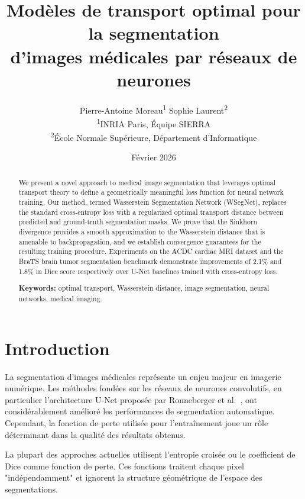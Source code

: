 \documentclass[11pt,a4paper]{article}
\title{Mod\`eles de transport optimal pour la segmentation\\
  d'images m\'edicales par r\'eseaux de neurones}
\author{Pierre-Antoine Moreau\textsuperscript{1}\quad
  Sophie Laurent\textsuperscript{2}\\[6pt]
  \textsuperscript{1}INRIA Paris, \'Equipe SIERRA\\
  \textsuperscript{2}\'Ecole Normale Sup\'erieure, D\'epartement d'Informatique}
\date{F\'evrier 2026}
\theoremstyle{definition}
\begin{document}
\maketitle

\begin{abstract}
We present a novel approach to medical image segmentation that leverages
optimal transport theory to define a geometrically meaningful loss function
for neural network training. Our method, termed Wasserstein Segmentation
Network (WSegNet), replaces the standard cross-entropy loss with a
regularized optimal transport distance between predicted and ground-truth
segmentation masks. We prove that the Sinkhorn divergence provides a
smooth approximation to the Wasserstein distance that is amenable to
backpropagation, and we establish convergence guarantees for the
resulting training procedure. Experiments on the ACDC cardiac MRI
dataset and the BraTS brain tumor segmentation benchmark demonstrate
improvements of 2.1\% and 1.8\% in Dice score respectively over
U-Net baselines trained with cross-entropy loss.

\medskip
\noindent\textbf{Keywords:} optimal transport, Wasserstein distance,
image segmentation, neural networks, medical imaging.
\end{abstract}


\section{Introduction}

La segmentation d'images m\'edicales repr\'esente un enjeu majeur en
imagerie num\'erique. Les m\'ethodes fond\'ees sur les r\'eseaux de
neurones convolutifs, en particulier l'architecture U-Net propos\'ee par
Ronneberger et al.~\cite{ronneberger2015unet}, ont consid\'erablement
am\'elior\'e les performances de segmentation automatique. Cependant,
la fonction de perte utilis\'ee pour l'entra\^inement joue un r\^ole
d\'eterminant dans la qualit\'e des r\'esultats obtenus.

La plupart des approches actuelles utilisent l'entropie crois\'ee ou le
coefficient de Dice comme fonction de perte. Ces fonctions traitent chaque
pixel "ind\'ependamment" et ignorent la structure g\'eom\'etrique de
l'espace des segmentations.
\end{document}
